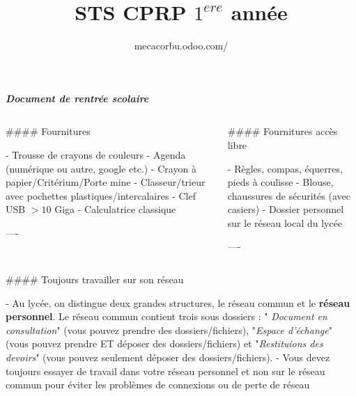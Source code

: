 \documentclass{beamer}
\author[Chevalier.V]{mecacorbu.odoo.com/}
\title{STS CPRP $1^{ere}$ année}
\institute{Lycée Le Corbusier}
\begin{document}
\begin{frame}[fragile]\centering

\textbf{\textit{Document de rentrée scolaire}}

\begin{columns}
\begin{column}{0.57\textwidth}

\begin{markdown}

#### Fournitures

- Trousse de crayons de couleurs
- Agenda (numérique ou autre, google etc.)
- Crayon à papier/Critérium/Porte mine
- Classeur/trieur avec pochettes plastiques/intercalaires
- Clef USB $> 10$ Giga 
- Calculatrice classique


----
\end{markdown}
\end{column}


\begin{column}{.4\textwidth}
\begin{markdown}




#### Fournitures accès libre

- Règles, compas, équerres, pieds à coulisse
- Blouse, chaussures de sécurités (avec casiers)
- Dossier personnel sur le réseau local du lycée



----
\end{markdown}
\end{column}

\end{columns}

\bigskip
{\hrulefill}
\bigskip

\begin{columns}[T]

\begin{column}{.46\textwidth}

\begin{markdown}

#### Toujours travailler sur son réseau

- Au lycée, on distingue deux grandes structures, le réseau commun et le \textbf{réseau personnel}. Le réseau commun contient trois sous dossiers : "\textit{ Document en consultation}" (vous pouvez prendre des dossiers/fichiers), "\textit{Espace d’échange}" (vous pouvez prendre ET déposer des dossiers/fichiers) et "\textit{Restituions des devoirs}" (vous pouvez seulement déposer des dossiers/fichiers).
- Vous devez toujours essayer de travail dans votre réseau personnel et non sur le réseau commun pour
éviter les problèmes de connexions ou de perte de réseau


\end{markdown}
\end{column}
\end{columns}
\end{frame}
\end{document}
